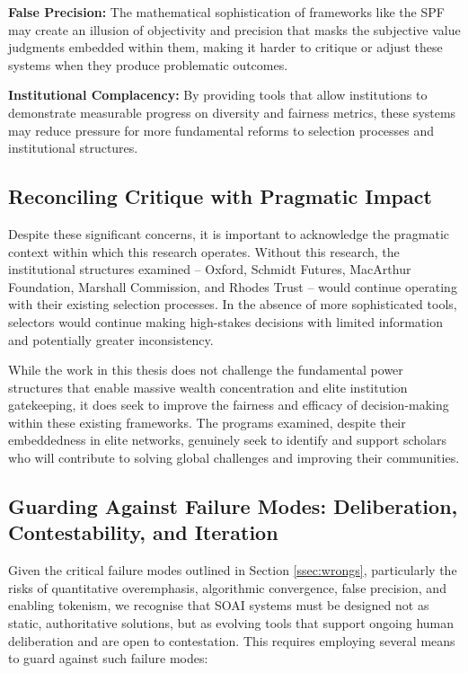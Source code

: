 \textbf{False Precision:} The mathematical sophistication of frameworks like the SPF may create an illusion of objectivity and precision that masks the subjective value judgments embedded within them, making it harder to critique or adjust these systems when they produce problematic outcomes.

\textbf{Institutional Complacency:} By providing tools that allow institutions to demonstrate measurable progress on diversity and fairness metrics, these systems may reduce pressure for more fundamental reforms to selection processes and institutional structures.

\subsection{Reconciling Critique with Pragmatic Impact}
Despite these significant concerns, it is important to acknowledge the pragmatic context within which this research operates. Without this research, the institutional structures examined – Oxford, Schmidt Futures, MacArthur Foundation, Marshall Commission, and Rhodes Trust – would continue operating with their existing selection processes. In the absence of more sophisticated tools, selectors would continue making high-stakes decisions with limited information and potentially greater inconsistency.

While the work in this thesis does not challenge the fundamental power structures that enable massive wealth concentration and elite institution gatekeeping, it does seek to improve the fairness and efficacy of decision-making within these existing frameworks. The programs examined, despite their embeddedness in elite networks, genuinely seek to identify and support scholars who will contribute to solving global challenges and improving their communities.

\subsection{Guarding Against Failure Modes: Deliberation, Contestability, and Iteration}\label{ssec:deliberation_contestability_iteration}
Given the critical failure modes outlined in Section \ref{ssec:wrongs}, particularly the risks of quantitative overemphasis, algorithmic convergence, false precision, and enabling tokenism, we recognise that SOAI systems must be designed not as static, authoritative solutions, but as evolving tools that support ongoing human deliberation and are open to contestation. This requires employing several means to guard against such failure modes:

